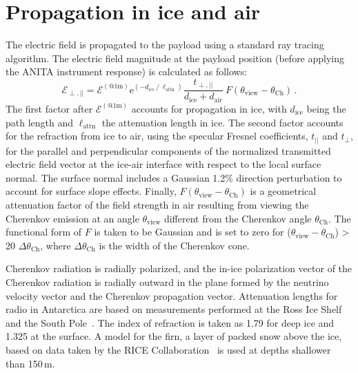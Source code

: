 \section{Propagation in ice and air}
\label{sec:propagation}



The electric field is propagated to the payload using a standard ray tracing algorithm.
The electric field magnitude at the payload position (before applying
the ANITA instrument response) is calculated as follows:
\begin{equation}
 \mathcal{E}_{\perp,||} = \mathcal{E}^{(\mathrm{@ 1m})}  
 \mathrm{e}^{(-d_{\mathrm{ice}}\ /\ \ell_{\mathrm{attn}})}
 \frac{t_{\perp,||}}{d_{\mathrm{ice}} + d_{\mathrm{air}}}
 \ F(\theta_{\mathrm{view}}-\theta_{\mathrm{Ch}}) \,.
\end{equation}
The first factor after $\mathcal{E}^{(\mathrm{@ 1m})}$ accounts for propagation in ice, with $d_{\mathrm{ice}}$ being the path length and $\ell_{\mathrm{attn}}$ the attenuation length in ice. 
The second factor accounts for the refraction from ice to air, using
the specular Fresnel coefficients, $t_{||}$ and $t_{\perp}$, for the parallel and perpendicular components of the normalized transmitted electric field vector at the ice-air interface with respect to the local surface normal.
The surface normal includes a Gaussian 1.2\% direction perturbation to account for surface slope effects.
Finally, $F(\theta_{\mathrm{view}}-\theta_{\mathrm{Ch}})$ is a geometrical attenuation factor of the field strength in air resulting from viewing the Cherenkov emission at an angle $\theta_{\mathrm{view}}$ different from the Cherenkov angle $\theta_{\mathrm{Ch}}$.
The functional form of $F$ is taken to be Gaussian and is set to zero for ($\theta_{\mathrm{view}}-\theta_{\mathrm{Ch}}$) > 20 $\Delta \theta_{\mathrm{Ch}}$, where $\Delta \theta_{\mathrm{Ch}}$ is the width of the Cherenkov cone. 


Cherenkov radiation is radially polarized, and the in-ice polarization vector of the Cherenkov radiation is radially outward in the plane formed by
the neutrino velocity vector and the Cherenkov propagation vector.
Attenuation lengths for radio in Antarctica are based on measurements performed at the Ross Ice Shelf and the South Pole~\cite{smex}.
The index of refraction is taken as 1.79 for deep ice and 1.325 at the surface. A model for the firn, a layer of packed snow above the ice, based on data taken by the RICE Collaboration~\cite{PhysRevD.73.082002} is used at depths shallower than 150\,m.

